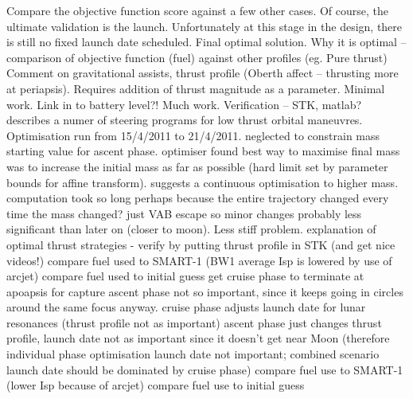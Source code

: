 Compare the objective function score against a few other cases.
Of course, the ultimate validation is the launch. Unfortunately at this stage in the design, there is still no fixed launch date scheduled.
Final optimal solution.
Why it is optimal – comparison of objective function (fuel) against other profiles (eg. Pure thrust)
Comment on gravitational assists, thrust profile (Oberth affect – thrusting more at periapsis).
Requires addition of thrust magnitude as a parameter. Minimal work.
Link in to battery level?! Much work.
Verification – STK, matlab?
\textcite{Pollard2000} describes a numer of steering programs for low thrust orbital maneuvres.
Optimisation run from 15/4/2011 to 21/4/2011. neglected to constrain mass starting value for ascent phase. optimiser found best way to maximise final mass was to increase the initial mass as far as possible (hard limit set by parameter bounds for affine transform). suggests a continuous optimisation to higher mass. computation took so long perhaps because the entire trajectory changed every time the mass changed? just VAB escape so minor changes probably less significant than later on (closer to moon). Less stiff problem.
explanation of optimal thrust strategies - \textcite{Herbiniere2000}
verify by putting thrust profile in STK (and get nice videos!)
compare fuel used to SMART-1 (BW1 average Isp is lowered by use of arcjet)
compare fuel used to initial guess
get cruise phase to terminate at apoapsis for capture
ascent phase not so important, since it keeps going in circles around the same focus anyway.
cruise phase adjusts launch date for lunar resonances (thrust profile not as important)
ascent phase just changes thrust profile, launch date not as important since it doesn't get near Moon (therefore individual phase optimisation launch date not important; combined scenario launch date should be dominated by cruise phase)
compare fuel use to SMART-1 (lower Isp because of arcjet)
compare fuel use to initial guess


